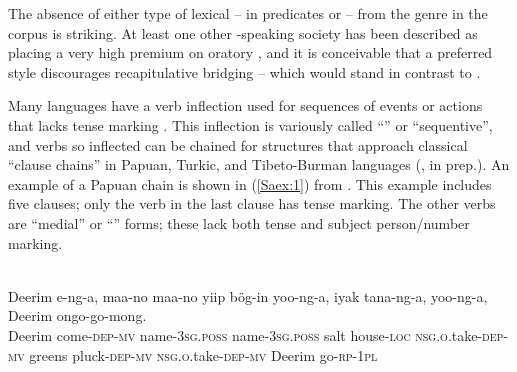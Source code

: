 \documentclass[output=paper]{LSP/langsci}
\begin{document}
The absence of either type of lexical  -- in predicates or  -- from the  genre in the corpus is striking. At least one other -speaking society has been described as placing a very high premium on oratory \citep{Albert1964}, and it is conceivable that a preferred   style discourages recapitulative bridging -- which would stand in contrast to  . 

Many  languages have a verb inflection used for sequences of events or actions that lacks tense marking \citep{Dalgish1979}. This inflection is variously called ``'' or ``sequentive'', and verbs so inflected can be chained for structures that approach classical ``clause chains'' in Papuan, Turkic, and Tibeto-Burman languages (\citeauthor{sarvasyforth}, in prep.). An example of a Papuan chain is shown in (\ref{Saex:1}) from . This example includes five clauses; only the verb in the last clause has tense marking. The other verbs are ``medial'' or ``'' forms; these lack both tense and subject person\slash number marking.

\begin{exe}
	\ex	\label{Saex:1}
\\
\gll		Deerim e-ng-a, maa-no maa-no yiip bög-in yoo-ng-a, iyak tana-ng-a, yoo-ng-a, Deerim ongo-go-mong.\\
			Deerim come-\textsc{dep}-\textsc{mv} name-\textsc{3sg.poss} name-\textsc{3sg.poss} salt house-\textsc{loc} \textsc{nsg.o.}take\textsc{-dep}-\textsc{mv} greens pluck-\textsc{dep}-\textsc{mv } \textsc{nsg.o.}take\textsc{-dep}-\textsc{mv} Deerim go-\textsc{rp}-\textsc{1pl}\\
		\glt	{} \citep[][252]{Sarvasy2017}
\end{exe}
\end{document}
